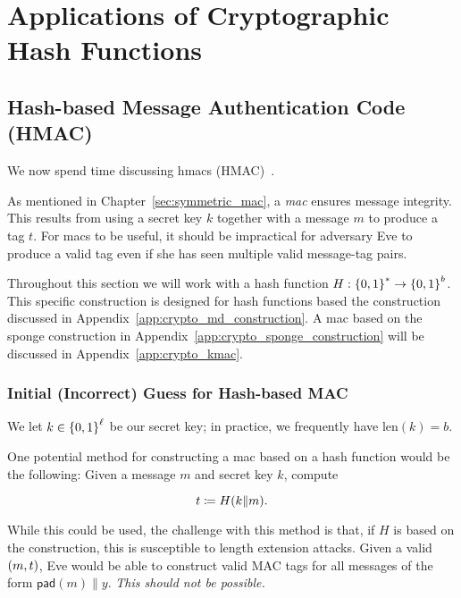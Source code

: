 \section{Applications of Cryptographic Hash Functions}

\subsection{Hash-based Message Authentication Code (HMAC)}
\label{app:crypto_hmac}

We now spend time discussing \glspl{hmac} (HMAC)~\cite{HMAC1996,rfc2104}.

As mentioned in Chapter~\ref{sec:symmetric_mac},
a \emph{\gls{mac}} ensures message integrity.
This results from using a secret key $k$ together with a message $m$
to produce a tag $t$.
For \glspl{mac} to be useful, it should be impractical for adversary Eve
to produce a valid tag even if she has seen multiple valid
message-tag pairs.

Throughout this section we will work with a \gls{hash function}
$H:\left\{ 0,1 \right\}^{*}\to\left\{ 0,1 \right\}^{b}$.
This specific construction is designed for \glspl{hash function}
based the \MD{} construction
discussed in Appendix~\ref{app:crypto_md_construction}.
A \gls{mac} based on the sponge construction in
Appendix~\ref{app:crypto_sponge_construction}
will be discussed in Appendix~\ref{app:crypto_kmac}.

\subsubsection{Initial (Incorrect) Guess for Hash-based MAC}

We let $k\in\left\{ 0,1 \right\}^{\ell}$ be our secret key;
in practice, we frequently have $\text{len}(k) = b$.

One potential method for constructing a \gls{mac} based on a
\gls{hash function} would be the following:
Given a message $m$ and secret key $k$, compute

\begin{equation}
    t \coloneqq{} H(k\|m).
\end{equation}

\noindent
While this could be used, the challenge with this method is that,
if $H$ is based on the \MD{} construction,
this is susceptible to length extension attacks.
Given a valid $\left( m,t \right)$, Eve would be able to construct
valid MAC tags for all messages of the form $\textsf{pad}(m)\|y$.
\emph{This should not be possible.}

